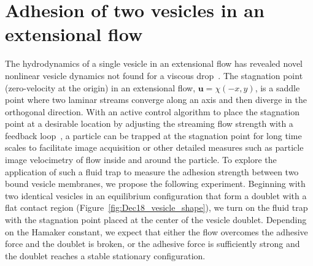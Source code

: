 \documentclass[prf,superscriptaddress,showkeys]{revtex4-1}
\newcommand{\uu}{\mathbf{u}}
\begin{document}
\section{Adhesion of two vesicles in an extensional flow} 
\label{sec:eflow} 
The hydrodynamics of a single vesicle in an extensional flow has
revealed novel nonlinear vesicle dynamics not found for a viscous
drop~\cite{KantslerSegreSteinberg2008_PRL, ZhaoShaqfeh2013_JFM,
Narsimhan2014_JFM, DahlNarsimhanGouveia2016_SoftMatt}.  The stagnation
point (zero-velocity at the origin) in an extensional flow, $\uu
=\chi(-x,y)$, is a saddle point where two laminar streams converge along
an axis and then diverge in the orthogonal direction.  With an active
control algorithm to place the stagnation point at a desirable location
by adjusting the streaming flow strength with a feedback
loop~\cite{Johnson-Chavarria2011_EMJ}, a particle can be trapped at the
stagnation point for long time scales to facilitate image acquisition or
other detailed measures such as particle image velocimetry of flow
inside and around the particle.  To explore the application of such a
fluid trap to measure the adhesion strength between two bound vesicle
membranes, we propose the following experiment.  Beginning with
two identical vesicles in an equilibrium configuration that form a
doublet with a flat contact region
(Figure~\ref{fig:Dec18_vesicle_shape}), we turn on the fluid trap with
the stagnation point placed at the center of the vesicle doublet.
Depending on the Hamaker constant, we expect that either the flow
overcomes the adhesive force and the doublet is broken, or the adhesive
force is sufficiently strong and the doublet reaches a stable stationary
configuration.

\end{document}
